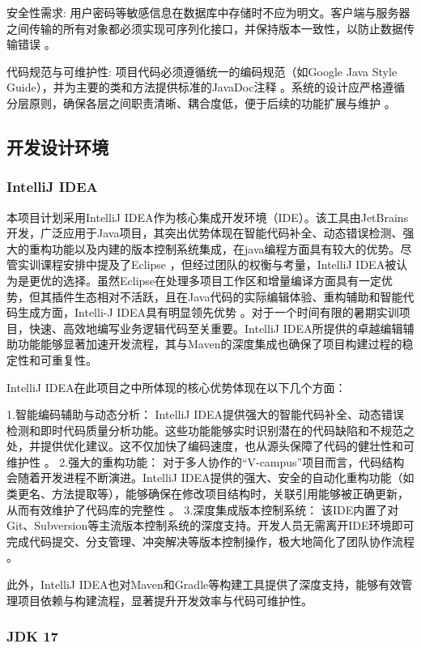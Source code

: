 安全性需求: 用户密码等敏感信息在数据库中存储时不应为明文。客户端与服务器之间传输的所有对象都必须实现可序列化接口，并保持版本一致性，以防止数据传输错误 。

代码规范与可维护性: 项目代码必须遵循统一的编码规范（如Google Java Style Guide），并为主要的类和方法提供标准的JavaDoc注释 。系统的设计应严格遵循分层原则，确保各层之间职责清晰、耦合度低，便于后续的功能扩展与维护 。

\subsection{开发设计环境}

\subsubsection{IntelliJ IDEA}

本项目计划采用IntelliJ IDEA作为核心集成开发环境（IDE）。该工具由JetBrains开发，广泛应用于Java项目，其突出优势体现在智能代码补全、动态错误检测、强大的重构功能以及内建的版本控制系统集成，在java编程方面具有较大的优势。尽管实训课程安排中提及了Eclipse ，但经过团队的权衡与考量，IntelliJ IDEA被认为是更优的选择。虽然Eclipse在处理多项目工作区和增量编译方面具有一定优势，但其插件生态相对不活跃，且在Java代码的实际编辑体验、重构辅助和智能代码生成方面，Intelli-J IDEA具有明显领先优势 。对于一个时间有限的暑期实训项目，快速、高效地编写业务逻辑代码至关重要。IntelliJ IDEA所提供的卓越编辑辅助功能能够显著加速开发流程，其与Maven的深度集成也确保了项目构建过程的稳定性和可重复性。

IntelliJ IDEA在此项目之中所体现的核心优势体现在以下几个方面：

1.智能编码辅助与动态分析： IntelliJ IDEA提供强大的智能代码补全、动态错误检测和即时代码质量分析功能。这些功能能够实时识别潜在的代码缺陷和不规范之处，并提供优化建议。这不仅加快了编码速度，也从源头保障了代码的健壮性和可维护性 。
2.强大的重构功能： 对于多人协作的“V-campus”项目而言，代码结构会随着开发进程不断演进。IntelliJ IDEA提供的强大、安全的自动化重构功能（如类更名、方法提取等），能够确保在修改项目结构时，关联引用能够被正确更新，从而有效维护了代码库的完整性 。
3.深度集成版本控制系统： 该IDE内置了对Git、Subversion等主流版本控制系统的深度支持。开发人员无需离开IDE环境即可完成代码提交、分支管理、冲突解决等版本控制操作，极大地简化了团队协作流程 。

此外，IntelliJ IDEA也对Maven和Gradle等构建工具提供了深度支持，能够有效管理项目依赖与构建流程，显著提升开发效率与代码可维护性。

\subsubsection{JDK 17}

